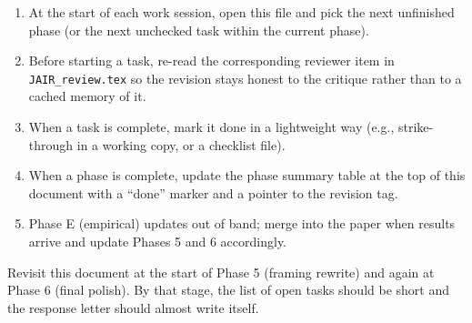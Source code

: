 \documentclass[11pt]{article}
\begin{document}
\begin{enumerate}[leftmargin=*]
\item At the start of each work session, open this file and pick the next unfinished phase (or the next unchecked task within the current phase).
\item Before starting a task, re-read the corresponding reviewer item in \texttt{JAIR\_review.tex} so the revision stays honest to the critique rather than to a cached memory of it.
\item When a task is complete, mark it done in a lightweight way (e.g., strike-through in a working copy, or a checklist file).
\item When a phase is complete, update the phase summary table at the top of this document with a ``done'' marker and a pointer to the revision tag.
\item Phase E (empirical) updates out of band; merge into the paper when results arrive and update Phases 5 and 6 accordingly.
\end{enumerate}

Revisit this document at the start of Phase 5 (framing rewrite) and again at Phase 6 (final polish). By that stage, the list of open tasks should be short and the response letter should almost write itself.
\end{document}
